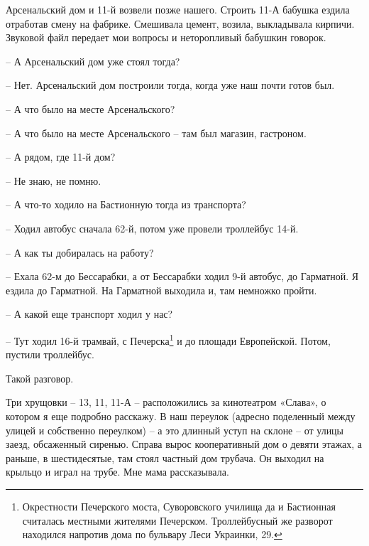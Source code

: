
   Арсенальский дом и 11-й возвели позже нашего. Строить 11-А бабушка ездила отработав смену на фабрике. Смешивала цемент, возила, выкладывала кирпичи. Звуковой файл передает мои вопросы и неторопливый бабушкин говорок.

   – А Арсенальский дом уже стоял тогда?

   – Нет. Арсенальский дом построили тогда, когда уже наш почти готов был.

   – А что было на месте Арсенальского?

   – А что было на месте Арсенальского – там был магазин, гастроном.

   – А рядом, где 11-й дом?

   – Не знаю, не помню.

   – А что-то ходило на Бастионную тогда из транспорта?

   – Ходил автобус сначала 62-й, потом уже провели троллейбус 14-й.

   – А как ты добиралась на работу?

   – Ехала 62-м до Бессарабки, а от Бессарабки ходил 9-й автобус, до Гарматной. Я ездила до Гарматной. На Гарматной выходила и, там немножко пройти.

   – А какой еще транспорт ходил у нас?

   – Тут ходил 16-й трамвай, с Печерска\footnote{Окрестности Печерского моста, Суворовского училища да и Бастионная считалась местными жителями Печерском. Троллейбусный же разворот находился напротив дома по бульвару Леси Украинки, 29.} и до площади Европейской. Потом, пустили троллейбус. 

Такой разговор.

Три хрущовки – 13, 11, 11-А – расположились за кинотеатром «Слава», о котором я еще подробно расскажу. В наш переулок (адресно поделенный между улицей и собственно переулком) – а это длинный уступ на склоне – от улицы заезд, обсаженный сиренью. Справа вырос кооперативный дом о девяти этажах, а раньше, в шестидесятые, там стоял частный дом трубача. Он выходил на крыльцо и играл на трубе. Мне мама рассказывала.

